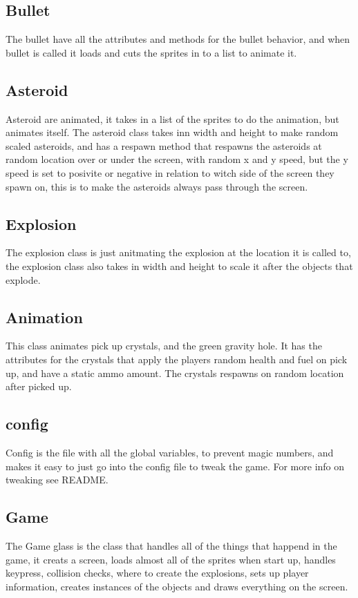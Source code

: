 \subsection{Bullet}
The bullet have all the attributes and methods for the bullet behavior, and when bullet is called it loads and cuts the sprites in to a list to animate it.

\subsection{Asteroid}
Asteroid are animated, it takes in a list of the sprites to do the animation, but animates itself. The asteroid class takes inn width and height to make random scaled asteroids, and has a respawn method that respawns the asteroids at random location over or under the screen, with random x and y speed, but the y speed is set to posivite or negative in relation to witch side of the screen they spawn on, this is to make the asteroids always pass through the screen.

\subsection{Explosion}
The explosion class is just anitmating the explosion at the location it is called to, the explosion class also takes in width and height to scale it after the objects that explode.

\subsection{Animation}
This class animates pick up crystals, and the green gravity hole. It has the attributes for the crystals that apply the players random health and fuel on pick up, and have a static ammo amount. The crystals respawns on random location after picked up.

\subsection{config}
Config is the file with all the global variables, to prevent magic numbers, and makes it easy to just go into the config file to tweak the game. For more info on tweaking see README.

\subsection{Game}
The Game glass is the class that handles all of the things that happend in the game, it creats a screen, loads almost all of the sprites when start up, handles keypress, collision checks, where to create the explosions, sets up player information, creates instances of the objects and draws everything on the screen. 

